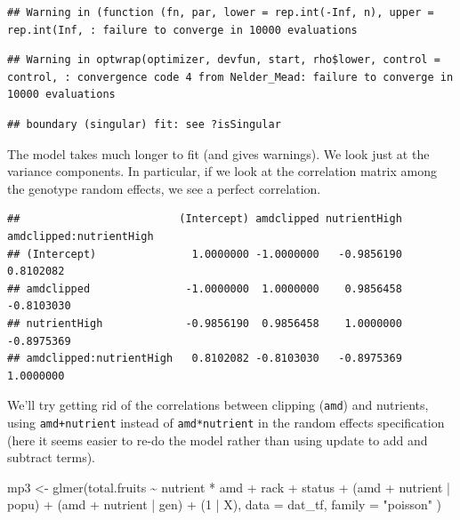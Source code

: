 \documentclass[
  12pt,
]{book}
\newenvironment{Shaded}{\begin{snugshade}}{\end{snugshade}}
\newcommand{\AttributeTok}[1]{\textcolor[rgb]{0.77,0.63,0.00}{#1}}
\newcommand{\DecValTok}[1]{\textcolor[rgb]{0.00,0.00,0.81}{#1}}
\newcommand{\FunctionTok}[1]{\textcolor[rgb]{0.00,0.00,0.00}{#1}}
\newcommand{\NormalTok}[1]{#1}
\newcommand{\OtherTok}[1]{\textcolor[rgb]{0.56,0.35,0.01}{#1}}
\newcommand{\SpecialCharTok}[1]{\textcolor[rgb]{0.00,0.00,0.00}{#1}}
\newcommand{\StringTok}[1]{\textcolor[rgb]{0.31,0.60,0.02}{#1}}
\begin{document}
\begin{verbatim}
## Warning in (function (fn, par, lower = rep.int(-Inf, n), upper = rep.int(Inf, : failure to converge in 10000 evaluations
\end{verbatim}

\begin{verbatim}
## Warning in optwrap(optimizer, devfun, start, rho$lower, control = control, : convergence code 4 from Nelder_Mead: failure to converge in 10000 evaluations
\end{verbatim}

\begin{verbatim}
## boundary (singular) fit: see ?isSingular
\end{verbatim}

The model takes much longer to fit (and gives warnings).
We look just at the variance components. In particular, if we look at the correlation matrix among the genotype random effects, we see a perfect
correlation.

\begin{Shaded}
\end{Shaded}

\begin{verbatim}
##                         (Intercept) amdclipped nutrientHigh amdclipped:nutrientHigh
## (Intercept)               1.0000000 -1.0000000   -0.9856190               0.8102082
## amdclipped               -1.0000000  1.0000000    0.9856458              -0.8103030
## nutrientHigh             -0.9856190  0.9856458    1.0000000              -0.8975369
## amdclipped:nutrientHigh   0.8102082 -0.8103030   -0.8975369               1.0000000
\end{verbatim}

We'll try getting rid of the correlations between clipping (\texttt{amd}) and nutrients, using \texttt{amd+nutrient} instead of \texttt{amd*nutrient} in the random effects specification (here it seems easier to re-do the model rather than using update to add and subtract terms).

\begin{Shaded}
\begin{Highlighting}[]
\NormalTok{mp3 }\OtherTok{\textless{}{-}} \FunctionTok{glmer}\NormalTok{(total.fruits }\SpecialCharTok{\textasciitilde{}}\NormalTok{ nutrient }\SpecialCharTok{*}\NormalTok{ amd }\SpecialCharTok{+}
\NormalTok{  rack }\SpecialCharTok{+}\NormalTok{ status }\SpecialCharTok{+}
\NormalTok{  (amd }\SpecialCharTok{+}\NormalTok{ nutrient }\SpecialCharTok{|}\NormalTok{ popu) }\SpecialCharTok{+}
\NormalTok{  (amd }\SpecialCharTok{+}\NormalTok{ nutrient }\SpecialCharTok{|}\NormalTok{ gen) }\SpecialCharTok{+}\NormalTok{ (}\DecValTok{1} \SpecialCharTok{|}\NormalTok{ X),}
\AttributeTok{data =}\NormalTok{ dat\_tf, }\AttributeTok{family =} \StringTok{"poisson"}
\NormalTok{)}
\end{Highlighting}
\end{Shaded}
\end{document}
